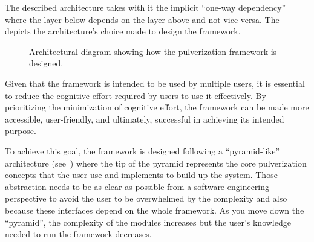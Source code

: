 The described architecture takes with it the implicit ``one-way dependency'' where the layer below depends on the layer above and not vice versa.
The~ depicts the architecture's choice made to design the framework.

\begin{figure}[ht]
	\centering
	\caption{Architectural diagram showing how the pulverization framework is designed.}
	\label{fig:framework-architecture}
\end{figure}

Given that the framework is intended to be used by multiple users, it is essential to reduce the cognitive effort required by users to
use it effectively. By prioritizing the minimization of cognitive effort, the framework can be made more accessible, user-friendly, and ultimately,
successful in achieving its intended purpose.

To achieve this goal, the framework is designed following a ``pyramid-like'' architecture (see~) where the tip of
the pyramid represents the core pulverization concepts that the user use and implements to build up the system.
Those abstraction needs to be as clear as possible from a software engineering perspective to avoid the user to be overwhelmed by the complexity
and also because these interfaces depend on the whole framework.
As you move down the ``pyramid'', the complexity of the modules increases but the user's knowledge needed to run the framework decreases.

